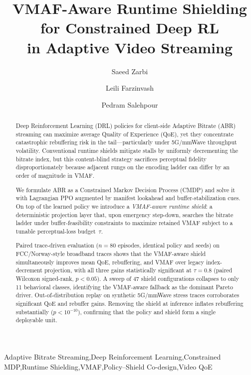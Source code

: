 \documentclass[preprint,12pt,times]{elsarticle}
\providecommand{\VNepisodes}{80}
\providecommand{\VShieldVariants}{47}
\providecommand{\VShieldBehaviors}{11}
\begin{document}
\begin{frontmatter}

\title{VMAF-Aware Runtime Shielding for Constrained Deep RL\\in Adaptive Video Streaming}

\author[uta]{Saeed Zarbi}
\author[uta]{Leili Farzinvash}
\author[uta]{Pedram Salehpour}

\address[uta]{Department of Computer Engineering, Faculty of Electrical and Computer Engineering, University of Tabriz, Tabriz, Iran}

\begin{abstract}
Deep Reinforcement Learning (DRL) policies for client-side Adaptive Bitrate (ABR) streaming can maximize average Quality of Experience (QoE), yet they concentrate catastrophic rebuffering risk in the tail---particularly under 5G/mmWave throughput volatility.
Conventional runtime shields mitigate stalls by uniformly decrementing the bitrate index, but this content-blind strategy sacrifices perceptual fidelity disproportionately because adjacent rungs on the encoding ladder can differ by an order of magnitude in VMAF.

We formulate ABR as a Constrained Markov Decision Process (CMDP) and solve it with Lagrangian PPO augmented by manifest lookahead and buffer-stabilization cues.
On top of the learned policy we introduce a \emph{VMAF-aware runtime shield}: a deterministic projection layer that, upon emergency step-down, searches the bitrate ladder under buffer-feasibility constraints to maximize retained VMAF subject to a tunable perceptual-loss budget~$\tau$.

Paired trace-driven evaluation ($n{=}\VNepisodes$ episodes, identical policy and seeds) on FCC/Norway-style broadband traces shows that the VMAF-aware shield simultaneously improves mean QoE, rebuffering, and VMAF over legacy index-decrement projection, with all three gains statistically significant at $\tau{=}0.8$ (paired Wilcoxon signed-rank, $p{<}0.05$).
A sweep of \VShieldVariants{} shield configurations collapses to only \VShieldBehaviors{} behavioral classes, identifying the VMAF-aware fallback as the dominant Pareto driver.
Out-of-distribution replay on synthetic 5G/mmWave stress traces corroborates significant QoE and rebuffer gains.
Removing the shield at inference inflates rebuffering substantially ($p{<}10^{-10}$), confirming that the policy and shield form a single deployable unit.
\end{abstract}

\begin{keyword}
Adaptive Bitrate Streaming\sep Deep Reinforcement Learning\sep Constrained MDP\sep Runtime Shielding\sep VMAF\sep Policy--Shield Co-design\sep Video QoE
\end{keyword}

\end{frontmatter}
\end{document}

